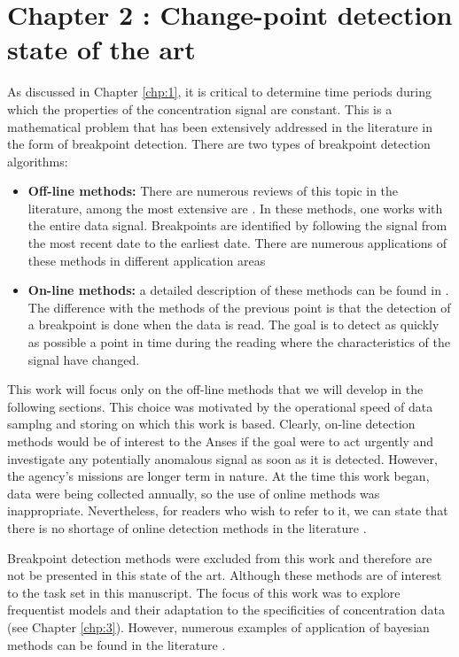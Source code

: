 \chapter{Chapter 2 : Change-point detection state of the art}\label{chp:2}

\minitoc

As discussed in Chapter \ref{chp:1}, it is critical to determine time periods during which the properties of the concentration signal are constant. This is a mathematical problem that has been extensively addressed in the literature in the form of breakpoint detection. There are two types of breakpoint detection algorithms:

\begin{itemize}
\item \textbf{Off-line methods:} There are numerous reviews of this topic in the literature, among the most extensive are \cite{basseville1993detection,truong2020}. In these methods, one works with the entire data signal. Breakpoints are identified by following the signal from the most recent date to the earliest date. There are numerous applications of these methods in different application areas \cite{chen2012parametric,levy2009detection,Shi2022,Li2021}
\item \textbf{On-line methods:} a detailed description of these methods can be found in \cite{basseville1993detection}. The difference with the methods of the previous point is that the detection of a breakpoint is done when the data is read. The goal is to detect as quickly as possible a point in time during the reading where the characteristics of the signal have changed. 
\end{itemize}

This work will focus only on the off-line methods that we will develop in the following sections. This choice was motivated by the operational speed of data samplng and storing on which this work is based. Clearly, on-line detection methods would be of interest to the Anses if the goal were to act urgently and investigate any potentially anomalous signal as soon as it is detected. However, the agency's missions are longer term in nature. At the time this work began, data were being collected annually, so the use of online methods was inappropriate. Nevertheless, for readers who wish to refer to it, we can state that there is no shortage of online detection methods in the literature \cite{liu2017change,Li2021,hohle2010online,ranganathan2010pliss,li2015m}.

Breakpoint detection methods were excluded from this work and therefore are not be presented in this state of the art. Although these methods are of interest to the task set in this manuscript. The focus of this work was to explore frequentist models and their adaptation to the specificities of concentration data (see Chapter \ref{chp:3}). However, numerous examples of application of bayesian methods can be found in the literature \cite{rigaill2012exact,tartakovsky2010state,adams2007bayesian,zhao2010bayesian,liang2019using}.

